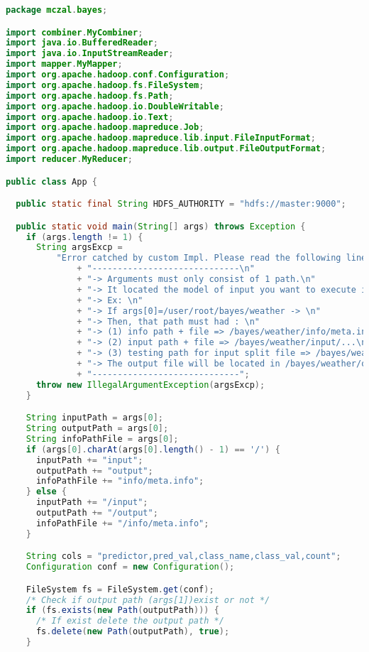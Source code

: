 \begin{lstlisting}[language=Java,basicstyle=\tiny,caption=App.java]
package mczal.bayes;

import combiner.MyCombiner;
import java.io.BufferedReader;
import java.io.InputStreamReader;
import mapper.MyMapper;
import org.apache.hadoop.conf.Configuration;
import org.apache.hadoop.fs.FileSystem;
import org.apache.hadoop.fs.Path;
import org.apache.hadoop.io.DoubleWritable;
import org.apache.hadoop.io.Text;
import org.apache.hadoop.mapreduce.Job;
import org.apache.hadoop.mapreduce.lib.input.FileInputFormat;
import org.apache.hadoop.mapreduce.lib.output.FileOutputFormat;
import reducer.MyReducer;

public class App {

  public static final String HDFS_AUTHORITY = "hdfs://master:9000";

  public static void main(String[] args) throws Exception {
    if (args.length != 1) {
      String argsExcp =
          "Error catched by custom Impl. Please read the following line below.\n"
              + "-----------------------------\n"
              + "-> Arguments must only consist of 1 path.\n"
              + "-> It located the model of input you want to execute in HDFS.\n"
              + "-> Ex: \n"
              + "-> If args[0]=/user/root/bayes/weather -> \n"
              + "-> Then, that path must had : \n"
              + "-> (1) info path + file => /bayes/weather/info/meta.info\n"
              + "-> (2) input path + file => /bayes/weather/input/...\n"
              + "-> (3) testing path for input split file => /bayes/weather/testing/input/...\n"
              + "-> The output file will be located in /bayes/weather/output/...\n"
              + "-----------------------------";
      throw new IllegalArgumentException(argsExcp);
    }

    String inputPath = args[0];
    String outputPath = args[0];
    String infoPathFile = args[0];
    if (args[0].charAt(args[0].length() - 1) == '/') {
      inputPath += "input";
      outputPath += "output";
      infoPathFile += "info/meta.info";
    } else {
      inputPath += "/input";
      outputPath += "/output";
      infoPathFile += "/info/meta.info";
    }

    String cols = "predictor,pred_val,class_name,class_val,count";
    Configuration conf = new Configuration();

    FileSystem fs = FileSystem.get(conf);
    /* Check if output path (args[1])exist or not */
    if (fs.exists(new Path(outputPath))) {
      /* If exist delete the output path */
      fs.delete(new Path(outputPath), true);
    }


\end{lstlisting}

